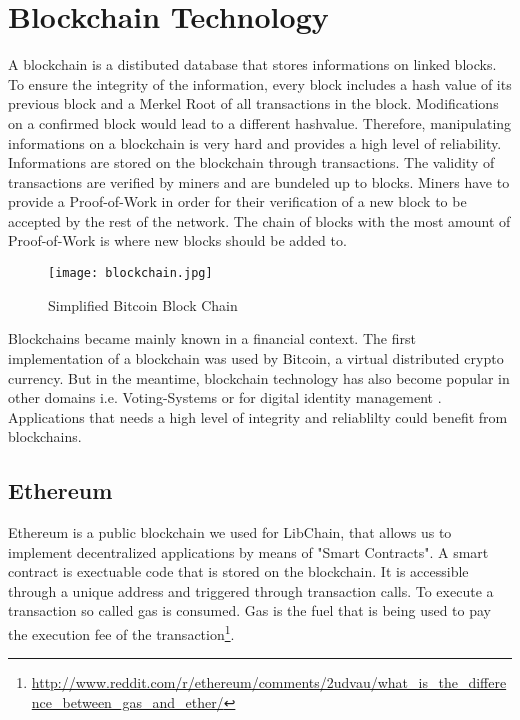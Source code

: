 \chapter{Blockchain Technology\label{cha:chapter1}}

A blockchain is a distibuted database that stores informations on linked blocks. To ensure the integrity of the information, every block includes a hash value of its previous block and a Merkel Root of all transactions in the block. Modifications on a confirmed block would lead to a different hashvalue. Therefore, manipulating informations on a blockchain is very hard and provides a high level of reliability.
Informations are stored on the blockchain through transactions. The validity of transactions are verified by miners and are bundeled up to blocks. Miners have to provide a Proof-of-Work in order for their verification of a new block to be accepted by the rest of the network. The chain of blocks with the most amount of Proof-of-Work is where new blocks should be added to. 

\vspace{0.3cm}
\begin{figure}[ht]
  \centering
   \texttt{[image: blockchain.jpg]}
  	\caption{Simplified Bitcoin Block Chain}
\end{figure}

Blockchains became mainly known in a financial context. The first implementation of a blockchain was used by Bitcoin, a virtual distributed crypto currency.
But in the meantime, blockchain technology has also become popular in other domains i.e. Voting-Systems \cite{yermack2017corporate} or for digital identity management \cite{isaen}. Applications that needs a high level of integrity and reliablilty could benefit from blockchains.

\section{Ethereum}
Ethereum is a public blockchain we used for LibChain, that allows us to implement decentralized applications by means of "Smart Contracts". A smart contract is exectuable code that is stored on the blockchain. It is accessible through a unique address and triggered through transaction calls.
To execute a transaction so called gas is consumed. Gas is the fuel that is being used to pay the execution fee of the transaction\footnote{\url{http://www.reddit.com/r/ethereum/comments/2udvau/what_is_the_difference_between_gas_and_ether/}}.

